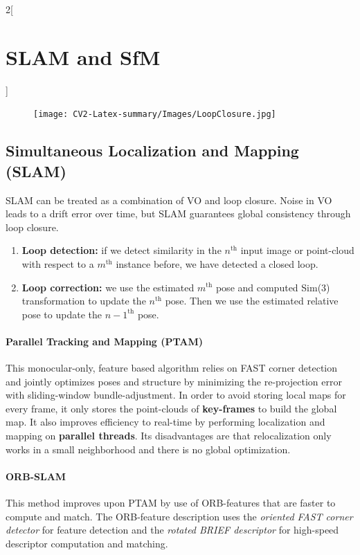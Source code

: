 \documentclass[oneside,fontsize=11pt,paper=a4]{scrartcl}
\begin{document}
\begin{multicols}{2}[\section{SLAM and SfM}]
\begin{figure}
    \texttt{[image: CV2-Latex-summary/Images/LoopClosure.jpg]}
\end{figure}
\subsection{Simultaneous Localization and Mapping (SLAM)} SLAM can be treated as a combination of VO and loop closure. Noise in VO leads to a drift error over time, but SLAM guarantees global consistency through loop closure. 
\begin{enumerate}
    \item \textbf{Loop detection:} if we detect similarity in the $n^{\text{th}}$ input image or point-cloud with respect to a $m^{\text{th}}$ instance before, we have detected a closed loop.
    \item \textbf{Loop correction:} we use the estimated $m^{\text{th}}$ pose and computed Sim(3) transformation to update the $n^{\text{th}}$ pose. Then we use the estimated relative pose to update the ${n-1}^{\text{th}}$ pose.
\end{enumerate}

\paragraph{Parallel Tracking and Mapping (PTAM)} This monocular-only, feature based algorithm relies on FAST corner detection and jointly optimizes poses and structure by minimizing the re-projection error with sliding-window bundle-adjustment. In order to avoid storing local maps for every frame, it only stores the point-clouds of \textbf{key-frames} to build the global map. It also improves efficiency to real-time by performing localization and mapping on \textbf{parallel threads}. Its disadvantages are that relocalization only works in a small neighborhood and there is no global optimization.

\paragraph{ORB-SLAM} This method improves upon PTAM by use of ORB-features that are faster to compute and match. The ORB-feature description uses the \textit{oriented FAST corner detector} for feature detection and the \textit{rotated BRIEF descriptor} for high-speed descriptor computation and matching.


\end{multicols}
\end{document}
